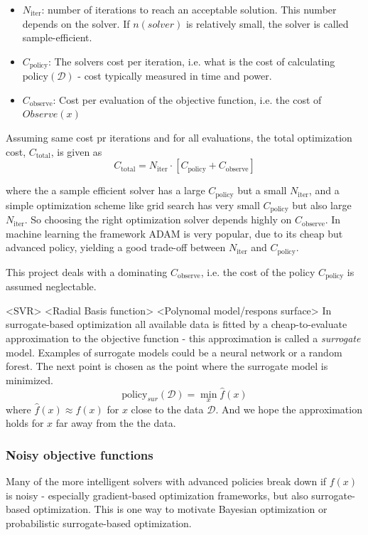 \begin{itemize}[noitemsep]
    \item $N_{\text{iter}}$: number of iterations to reach an acceptable solution. This number depends on the
    solver. If $n(solver)$ is relatively small, the solver is called sample-efficient. 
    \item $C_{\text{policy}}$: The solvers cost per iteration, i.e. what is the cost of calculating
    $\text{policy}(\mathcal{D})$  - cost typically measured in time and power. 
    \item $C_{\text{observe}}$: Cost per evaluation of the objective function, i.e. the cost of $Observe(x)$
\end{itemize}
Assuming same cost pr iterations and for all evaluations, the total optimization cost, $C_{\text{total}}$, is given as 
$$C_{\text{total}} = N_{\text{iter}} \cdot \left[ C_{\text{policy}} + C_{\text{observe}}\right]$$

where the a sample efficient solver has a large $C_{\text{policy}}$ but a small $N_{\text{iter}}$, and
a simple optimization scheme like grid search has  very small $C_{\text{policy}}$ but also large $N_{\text{iter}}$. 
So choosing the right optimization solver depends highly on $C_{\text{observe}}$. In machine learning the framework 
ADAM is very popular, due to its cheap but advanced policy, yielding a good trade-off between $N_{\text{iter}}$ and 
$C_{\text{policy}}$.

This project deals with a dominating $C_{\text{observe}}$, i.e. the cost of the policy $C_{\text{policy}}$
is assumed neglectable. 

\begin{testexample}
    <SVR> <Radial Basis function> <Polynomal model/respons surface>
    In surrogate-based optimization all available data is fitted by a cheap-to-evaluate approximation
    to the objective function - this approximation is called a \textit{surrogate} model. Examples
    of surrogate models could be a neural network or a random forest. The next point is 
    chosen as the point where the surrogate model is minimized. 
    $$\text{policy}_{sur}(\mathcal{D}) = \min_x \hat f(x)$$
    where $\hat f(x) \approx f(x)$ for $x$ close to the data $\mathcal{D}$. And we hope the approximation
    holds for $x$ far away from the the data.
\end{testexample}

\subsubsection{Noisy objective functions}
Many of the more intelligent solvers with advanced policies break down if $f(x)$ is noisy - especially gradient-based
optimization frameworks, but also surrogate-based optimization. This is one way to motivate Bayesian optimization
or probabilistic surrogate-based optimization. 

